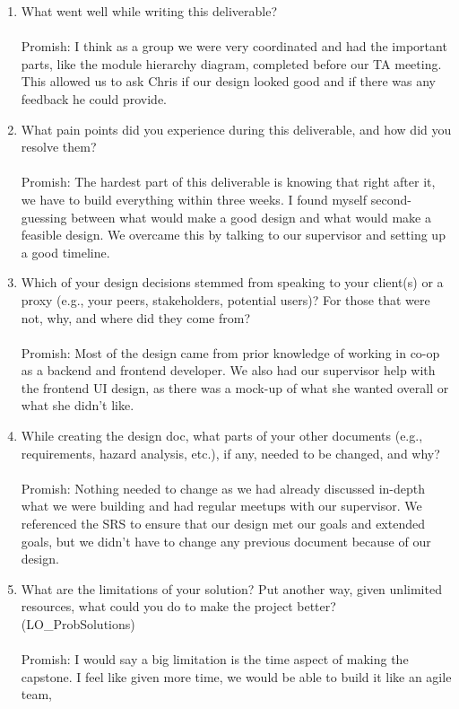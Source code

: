 \documentclass[12pt, titlepage]{article}
\begin{document}
\begin{enumerate}
  \item What went well while writing this deliverable? \\
  \\Promish: I think as a group we were very coordinated and had the important parts, like the module
  hierarchy diagram, completed before our TA meeting. This allowed us to ask Chris if our design looked good and if 
  there was any feedback he could provide.
  \item What pain points did you experience during this deliverable, and how
    did you resolve them? \\
    \\Promish: The hardest part of this deliverable is knowing that right after it, we have to build everything within three weeks.
    I found myself second-guessing between what would make a good design and what would make a feasible design. We overcame
    this by talking to our supervisor and setting up a good timeline.
  \item Which of your design decisions stemmed from speaking to your client(s)
  or a proxy (e.g., your peers, stakeholders, potential users)? For those that
  were not, why, and where did they come from? \\
  \\Promish: Most of the design came from prior knowledge of working in co-op as a backend and frontend developer.
  We also had our supervisor help with the frontend UI design, as there was a mock-up of what she wanted overall or what she didn't like.
  \item While creating the design doc, what parts of your other documents (e.g.,
  requirements, hazard analysis, etc.), if any, needed to be changed, and why? \\
  \\Promish: Nothing needed to change as we had already discussed in-depth what we were building and had regular meetups with our supervisor.
  We referenced the SRS to ensure that our design met our goals and extended goals, but we didn't have to change any previous document because of our design.
  \item What are the limitations of your solution? Put another way, given
  unlimited resources, what could you do to make the project better? (LO\_ProbSolutions) \\
  \\Promish: I would say a big limitation is the time aspect of making the capstone. I feel like given more time, we would be able to build it like an agile team,

\end{enumerate}
\end{document}
